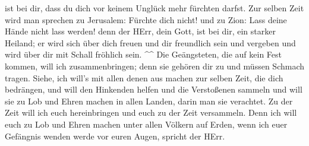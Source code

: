 ist bei dir, dass du dich vor keinem Unglück mehr fürchten darfst.
 Zur selben Zeit wird man sprechen zu Jerusalem: Fürchte
dich nicht! und zu Zion: Lass deine Hände nicht lass werden!
 denn der HErr, dein Gott, ist bei dir, ein starker
Heiland; er wird sich über dich freuen und dir freundlich sein und
vergeben und wird über dir mit Schall fröhlich sein. \^{}\^{}
 Die Geängsteten, die auf kein Fest kommen, will ich
zusammenbringen; denn sie gehören dir zu und müssen Schmach tragen.
 Siehe, ich will's mit allen denen aus machen zur selben
Zeit, die dich bedrängen, und will den Hinkenden helfen und die
Verstoßenen sammeln und will sie zu Lob und Ehren machen in allen
Landen, darin man sie verachtet.  Zu der Zeit will ich euch
hereinbringen und euch zu der Zeit versammeln. Denn ich will euch zu Lob
und Ehren machen unter allen Völkern auf Erden, wenn ich euer Gefängnis
wenden werde vor euren Augen, spricht der HErr.
